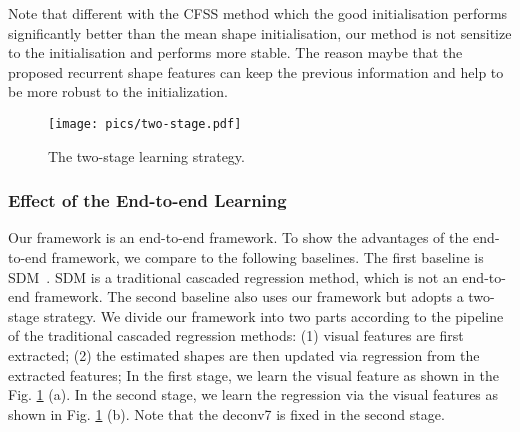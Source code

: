 \documentclass[journal]{IEEEtran}
\begin{document}

Note that different with the CFSS method which the good initialisation performs significantly better than the mean shape initialisation, our method is not sensitize to the initialisation and performs more stable. The reason maybe that the proposed recurrent shape features can keep the previous information and help to be more robust to the initialization.


\begin{figure}[t]
\centering
    \texttt{[image: pics/two-stage.pdf]}
  \caption{The two-stage learning strategy. }
  \label{two-stages}  %
\end{figure}

\subsubsection{Effect of the End-to-end Learning}
Our framework is an end-to-end framework. To show the advantages of the end-to-end framework, we compare to the following baselines. The first baseline is SDM~\cite{sdm}. SDM is a traditional cascaded regression method, which is not an end-to-end framework. The second baseline also uses our framework but adopts a two-stage strategy. We divide our framework into two parts according to the pipeline of the traditional cascaded regression methods: (1) visual features are first extracted; (2) the estimated shapes are then updated via regression from the extracted features; In the first stage, we learn the visual feature as shown in the Fig. \ref{two-stages} (a). In the second stage, we learn the regression via the visual features as shown in Fig. \ref{two-stages} (b). Note that the deconv7 is fixed in the second stage.
\end{document}
